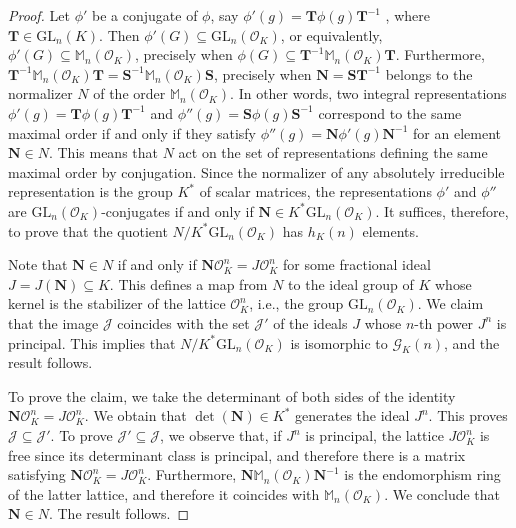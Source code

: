 \documentclass{article}
\theoremstyle{definition}
\begin{document}
\begin{proof}
    Let $\phi'$ be a conjugate of $\phi$, say 
    $\phi'(g)=\mathbf{T}\phi(g)\mathbf{T}^{-1}$ , where 
    $\mathbf{T}\in\mathrm{GL}_n(K)$. Then $\phi'(G)\subseteq
    \mathrm{GL}_n(\mathcal{O}_K)$, or equivalently, $\phi'(G)\subseteq
    \mathbb{M}_n(\mathcal{O}_K)$, precisely when $\phi(G)\subseteq
    \mathbf{T}^{-1}\mathbb{M}_n(\mathcal{O}_K)\mathbf{T}$. Furthermore,
    $\mathbf{T}^{-1}\mathbb{M}_n(\mathcal{O}_K)\mathbf{T}=
    \mathbf{S}^{-1}\mathbb{M}_n(\mathcal{O}_K)\mathbf{S}$, precisely when
    $\mathbf{N}=\mathbf{S}\mathbf{T}^{-1}$ belongs to the normalizer $N$ 
    of the order $\mathbb{M}_n(\mathcal{O}_K)$. In other words, 
    two integral representations 
    $\phi'(g)=\mathbf{T}\phi(g)\mathbf{T}^{-1}$ and
    $\phi''(g)=\mathbf{S}\phi(g)\mathbf{S}^{-1}$ correspond to the same
    maximal order if and only if they satisfy 
    $\phi''(g)=\mathbf{N}\phi'(g)\mathbf{N}^{-1}$ for an element 
    $\mathbf{N}\in N$. This means that $N$ act on the set of 
    representations defining the same maximal order by conjugation.
    Since the normalizer of any absolutely irreducible representation 
    is the group $K^*$ of scalar matrices, the representations $\phi'$
    and $\phi''$ are $\mathrm{GL}_n(\mathcal{O}_K)$-conjugates if and
    only if $\mathbf{N}\in K^*\mathrm{GL}_n(\mathcal{O}_K)$. 
    It suffices, therefore, to prove that the quotient 
    $N/K^*\mathrm{GL}_n(\mathcal{O}_K)$ has $h_K(n)$ elements.
    
    Note that $\mathbf{N}\in N$ if and only if
    $\mathbf{N} \mathcal{O}_K^n=J\mathcal{O}_K^n$ for some fractional ideal
    $J=J(\mathbf{N})\subseteq K$. This defines a map from $N$ to the ideal 
    group of $K$ whose kernel is the stabilizer of the lattice 
    $\mathcal{O}_K^n$, i.e., the group $\mathrm{GL}_n(\mathcal{O}_K)$.
    We claim that the image $\mathcal{J}$ coincides with the set $\mathcal{J}'$
    of the ideals $J$ whose $n$-th power $J^n$ is principal. This implies that
    $N/K^*\mathrm{GL}_n(\mathcal{O}_K)$ is isomorphic to 
    $\mathcal{G}_K(n)$, and the result follows.

    To prove the claim, we take the determinant of both sides of the identity 
    $\mathbf{N} \mathcal{O}_K^n=J\mathcal{O}_K^n$. We 
    obtain that $\det(\mathbf{N})\in K^*$ generates the ideal $J^n$.
    This proves $\mathcal{J}\subseteq\mathcal{J}'$. To prove 
    $\mathcal{J}'\subseteq\mathcal{J}$, we observe that, if $J^n$ is principal, 
    the lattice $J\mathcal{O}_K^n$ is free since its determinant class is 
    principal, and therefore there is a matrix satisfying 
    $\mathbf{N} \mathcal{O}_K^n=J\mathcal{O}_K^n$. Furthermore,
    $\mathbf{N}\mathbb{M}_n(\mathcal{O}_K)\mathbf{N}^{-1}$ is the endomorphism
    ring of the latter lattice, and therefore it coincides with
    $\mathbb{M}_n(\mathcal{O}_K)$. We conclude that $\mathbf{N}\in N$.
    The result follows.
\end{proof}
\end{document}
